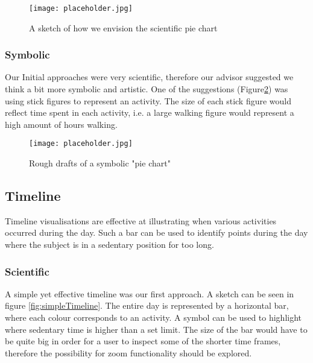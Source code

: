 \begin{figure}[h!]
	\centering
		\texttt{[image: placeholder.jpg]}
		\caption{\footnotesize A sketch of how we envision the scientific pie chart}
		\label{fig:scientificPie}
\end{figure}

\subsubsection{Symbolic}
Our Initial approaches were very scientific, therefore our advisor suggested we think a bit more symbolic and artistic. One of the suggestions (Figure\ref{fig:symbolicPie}) was using stick figures to represent an activity. The size of each stick figure would reflect time spent in each activity, i.e. a large walking figure would represent a high amount of hours walking. %
\begin{figure}[h!]
	\centering
		\texttt{[image: placeholder.jpg]}
		\caption{\footnotesize Rough drafts of a symbolic "pie chart"}
		\label{fig:symbolicPie}
\end{figure}

\subsection{Timeline}
Timeline visualisations are effective at illustrating when various activities occurred during the day. Such a bar can be used to identify points during the day where the subject is in a sedentary position for too long.

\subsubsection{Scientific}
A simple yet effective timeline was our first approach. A sketch can be seen in figure \ref{fig:simpleTimeline}. The entire day is represented by a horizontal bar, where each colour corresponds to an activity. A symbol can be used to highlight where sedentary time is higher than a set limit. The size of the bar would have to be quite big in order for a user to inspect some of the shorter time frames, therefore the possibility for zoom functionality should be explored.

